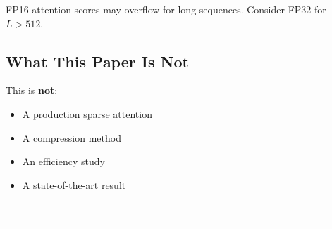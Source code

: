 FP16 attention scores may overflow for long sequences. Consider FP32 for 
$L > 512$.

\subsection{What This Paper Is Not}

This is \textbf{not}:
\begin{itemize}
\item A production sparse attention
\item A compression method
\item An efficiency study
\item A state-of-the-art result
\end{itemize}
\begin{lstlisting}

---
\end{lstlisting}